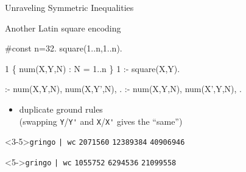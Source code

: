 \begin{frame}[fragile]{Unraveling Symmetric Inequalities}
\begin{block}{Another Latin square encoding}
\vspace*{-4mm}\footnotesize
\begin{semiverbatim}
#const n=32. square(1..n,1..n).

1 \{ num(X,Y,N) : N = 1..n \} 1 :- square(X,Y).

:- num(X,\alert<2>{Y},N), num(X,\alert<2>{Y'},N), .
:- num(\alert<2>{X},Y,N), num(\alert<2>{X'},Y,N), .
\end{semiverbatim}
\vspace*{-2mm}
\end{block}
\begin{itemize}
\item<2-3> \alert<2>{duplicate ground rules
\\\small (swapping \lstinline{Y}/\lstinline{Y'} and \lstinline{X}/\lstinline{X'}
 gives the ``same'')}
\end{itemize}
\vspace*{-4mm}
\begin{minipage}[t]{0.47\linewidth}%
\begin{block}<3-5>{\lstinline{gringo}  \lstinline{| wc}}
\lstinline{2071560} \alert<5>{\lstinline{12389384}} \lstinline{40906946}
\end{block}
\end{minipage}\hfill
\begin{minipage}[t]{0.47\linewidth}%
\begin{block}<5->{\lstinline{gringo}  \lstinline{| wc}}
\lstinline{1055752} \alert<5>{\lstinline{6294536}} \lstinline{21099558}
\end{block}
\end{minipage}
\end{frame}
